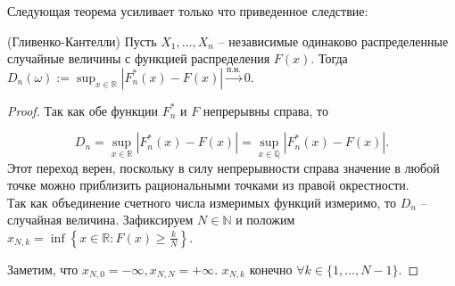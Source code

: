Следующая теорема усиливает только что приведенное следствие:

\begin{theorem}
	(Гливенко-Кантелли) Пусть $\displaystyle X_{1} ,\dotsc ,X_{n}$ -- независимые одинаково распределенные случайные величины с функцией распределения $\displaystyle F( x)$. Тогда $\displaystyle D_{n}( \omega ) :=\sup _{x\in \mathbb{R}}\left| F_{n}^{*}( x) -F( x)\right| \xrightarrow{\text{п.н.}} 0$.
\end{theorem}
\begin{proof}
    Так как обе функции $\displaystyle F_{n}^{*}$ и $\displaystyle F$ непрерывны справа, то
    
    
    \begin{equation*}
    	D_{n} =\sup _{x\in \mathbb{R}}\left| F_{n}^{*}( x) -F( x)\right| =\sup _{x\in \mathbb{Q}}\left| F_{n}^{*}( x) -F( x)\right| .
    \end{equation*}
    Этот переход верен, поскольку в силу непрерывности справа значение в любой точке можно приблизить рациональными точками из правой окрестности.\\
    
    Так как объединение счетного числа измеримых функций измеримо, то $\displaystyle D_{n}$ -- случайная величина. Зафиксируем $\displaystyle N\in \mathbb{N}$ и положим $\displaystyle x_{N,k} =\inf\left\{x\in \mathbb{R} :F( x) \geqslant \frac{k}{N}\right\}$. 

    Заметим, что $x_{N,0} = -\infty, x_{N,N} = +\infty$. $x_{N,k}$ конечно $\forall k \in \{1, \dots, N-1\}$.
    

\end{proof}
